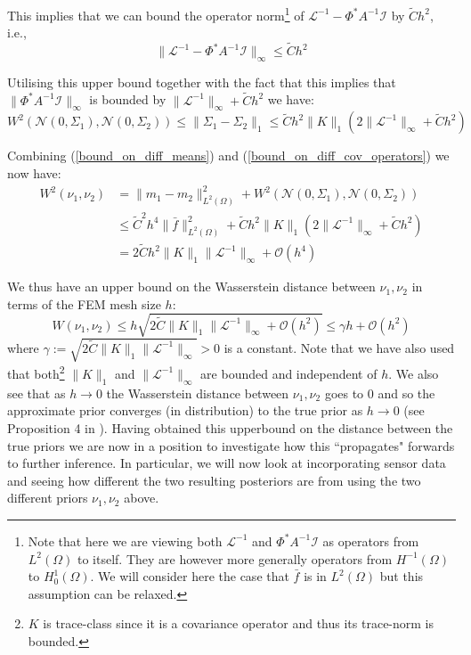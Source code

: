 This implies that we can bound the operator norm\footnote{Note that here we are viewing both $\mathcal{L}^{-1}$ and $\Phi^{*}A^{-1}\mathcal{I}$ as operators from $L^{2}(\Omega)$ to itself. They are however more generally operators from $H^{-1}(\Omega)$ to $H^{1}_{0}(\Omega)$. We will consider here the case that $\bar{f}$ is in $L^{2}(\Omega)$ but this assumption can be relaxed.} of $\mathcal{L}^{-1}-\Phi^{*}A^{-1}\mathcal{I}$ by $\tilde{C}h^{2}$, i.e.,
\begin{equation}
    \label{bound_on_diff_of_solution_operators}
    \|\mathcal{L}^{-1}-\Phi^{*}A^{-1}\mathcal{I}\|_{\infty}\leq \tilde{C}h^{2}
\end{equation}

Utilising this upper bound together with the fact that this implies that $\|\Phi^{*}A^{-1}\mathcal{I}\|_{\infty}$ is bounded by $\|\mathcal{L}^{-1}\|_{\infty}+\tilde{C}h^2$ we have:
\begin{equation}
    \label{bound_on_diff_cov_operators}
    W^{2}(\mathcal{N}(0,\Sigma_1),\mathcal{N}(0,\Sigma_2))\leq\|\Sigma_{1}-\Sigma_{2}\|_{1}\leq \tilde{C}h^{2}\|K\|_{1}\left(2\|\mathcal{L}^{-1}\|_{\infty}+\tilde{C}h^2\right)
\end{equation}

Combining (\ref{bound_on_diff_means}) and (\ref{bound_on_diff_cov_operators}) we now have:
\begin{align*}
    W^{2}(\nu_{1},\nu_{2})&=\|m_1-m_2\|_{L^{2}(\Omega)}^{2}+W^{2}(\mathcal{N}(0,\Sigma_1),\mathcal{N}(0,\Sigma_2)) \\
    &\leq \tilde{C}^{2}h^4\|\bar{f}\|^{2}_{L^{2}(\Omega)}+ \tilde{C}h^{2}\|K\|_{1}\left(2\|\mathcal{L}^{-1}\|_{\infty}+\tilde{C}h^2\right) \\
    &=2\tilde{C}h^{2}\|K\|_{1}\|\mathcal{L}^{-1}\|_{\infty}+\mathcal{O}(h^4)
\end{align*}

We thus have an upper bound on the Wasserstein distance between $\nu_{1},\nu_{2}$ in terms of the FEM mesh size $h$:
\begin{equation}
    \label{bound_on_distance}
    W(\nu_{1},\nu_{2})\leq h \sqrt{2\tilde{C}\|K\|_{1}\|\mathcal{L}^{-1}\|_{\infty}+\mathcal{O}(h^2)}\leq \gamma h +\mathcal{O}(h^2)
\end{equation}
where $\gamma:=\sqrt{2\tilde{C}\|K\|_{1}\|\mathcal{L}^{-1}\|_{\infty}}>0$ is a constant. Note that we have also used that both\footnote{$K$ is trace-class since it is a covariance operator and thus its trace-norm is bounded.} $\|K\|_{1}$ and $\|\mathcal{L}^{-1}\|_{\infty}$ are bounded and independent of $h$. We also see that as $h\rightarrow 0$ the Wasserstein distance between $\nu_1,\nu_2$ goes to 0 and so the approximate prior converges (in distribution) to the true prior as $h\rightarrow 0$ (see Proposition 4 in \textcolor{blue}{\cite{masarotto2019procrustes}}). Having obtained this upperbound on the distance between the true priors we are now in a position to investigate how this ``propagates" forwards to further inference. In particular, we will now look at incorporating sensor data and seeing how different the two resulting posteriors are from using the two different priors $\nu_1,\nu_2$ above.

